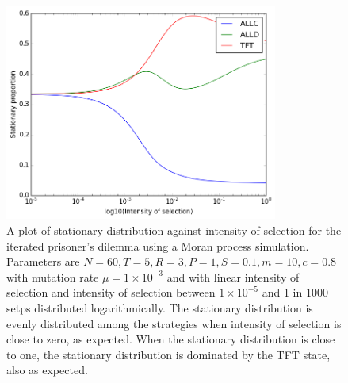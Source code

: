 \begin{figure}[h]
    \centering
    \includegraphics[width = 0.8\textwidth]{graphics/stationarydist}
    \caption{A plot of stationary distribution against intensity of selection for the iterated prisoner's dilemma using a Moran process simulation.
        Parameters are $N = 60, T = 5, R = 3, P = 1, S = 0.1, m = 10, c = 0.8$ with mutation rate $\mu = 1 \times 10^{-3}$ and with linear intensity of selection and intensity of selection between $1 \times 10^{-5}$ and 1 in 1000 setps distributed logarithmically.
        The stationary distribution is evenly distributed among the strategies when intensity of selection is close to zero, as expected.
    When the stationary distribution is close to one, the stationary distribution is dominated by the TFT state, also as expected.}
    \label{stationarydist}
\end{figure}

